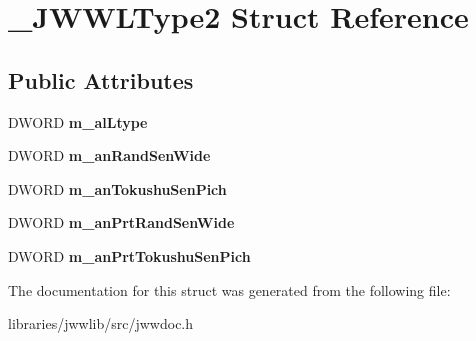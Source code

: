 \hypertarget{struct__JWWLType2}{\section{\-\_\-\-J\-W\-W\-L\-Type2 Struct Reference}
\label{struct__JWWLType2}
}
\subsection*{Public Attributes}
\begin{DoxyCompactItemize}
\item 
\hypertarget{struct__JWWLType2_aa560b681724acc0b8c19462f1f173a1b}{D\-W\-O\-R\-D {\bfseries m\-\_\-al\-Ltype}}\label{struct__JWWLType2_aa560b681724acc0b8c19462f1f173a1b}

\item 
\hypertarget{struct__JWWLType2_ae339a5da00eed6fc09a9ecec8e31904e}{D\-W\-O\-R\-D {\bfseries m\-\_\-an\-Rand\-Sen\-Wide}}\label{struct__JWWLType2_ae339a5da00eed6fc09a9ecec8e31904e}

\item 
\hypertarget{struct__JWWLType2_a987e67caff18521b890ef48aada8a071}{D\-W\-O\-R\-D {\bfseries m\-\_\-an\-Tokushu\-Sen\-Pich}}\label{struct__JWWLType2_a987e67caff18521b890ef48aada8a071}

\item 
\hypertarget{struct__JWWLType2_a63bd6498d68a976cc1c3f16dc5692554}{D\-W\-O\-R\-D {\bfseries m\-\_\-an\-Prt\-Rand\-Sen\-Wide}}\label{struct__JWWLType2_a63bd6498d68a976cc1c3f16dc5692554}

\item 
\hypertarget{struct__JWWLType2_a41442831f0a375f81a83c062d2f8ce42}{D\-W\-O\-R\-D {\bfseries m\-\_\-an\-Prt\-Tokushu\-Sen\-Pich}}\label{struct__JWWLType2_a41442831f0a375f81a83c062d2f8ce42}

\end{DoxyCompactItemize}


The documentation for this struct was generated from the following file\-:\begin{DoxyCompactItemize}
\item 
libraries/jwwlib/src/jwwdoc.\-h\end{DoxyCompactItemize}

